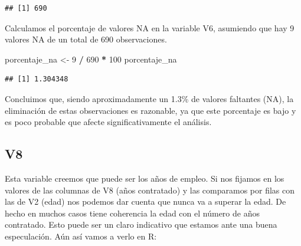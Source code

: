 \documentclass[
]{article}
\newenvironment{Shaded}{\begin{snugshade}}{\end{snugshade}}
\newcommand{\DecValTok}[1]{\textcolor[rgb]{0.00,0.00,0.81}{#1}}
\newcommand{\FunctionTok}[1]{\textcolor[rgb]{0.13,0.29,0.53}{\textbf{#1}}}
\newcommand{\NormalTok}[1]{#1}
\newcommand{\OtherTok}[1]{\textcolor[rgb]{0.56,0.35,0.01}{#1}}
\newcommand{\SpecialCharTok}[1]{\textcolor[rgb]{0.81,0.36,0.00}{\textbf{#1}}}
\begin{document}
\begin{Shaded}
\end{Shaded}

\begin{verbatim}
## [1] 690
\end{verbatim}

Calculamos el porcentaje de valores NA en la variable V6, asumiendo que
hay 9 valores NA de un total de 690 observaciones.

\begin{Shaded}
\begin{Highlighting}[]
\NormalTok{porcentaje\_na }\OtherTok{\textless{}{-}} \DecValTok{9} \SpecialCharTok{/} \DecValTok{690} \SpecialCharTok{*} \DecValTok{100}
\NormalTok{porcentaje\_na}
\end{Highlighting}
\end{Shaded}

\begin{verbatim}
## [1] 1.304348
\end{verbatim}

Concluimos que, siendo aproximadamente un 1.3\% de valores faltantes
(NA), la eliminación de estas observaciones es razonable, ya que este
porcentaje es bajo y es poco probable que afecte significativamente el
análisis.

\hypertarget{v8}{%
\subsection{V8}\label{v8}}

Esta variable creemos que puede ser los años de empleo. Si nos fijamos
en los valores de las columnas de V8 (años contratado) y las comparamos
por filas con las de V2 (edad) nos podemos dar cuenta que nunca va a
superar la edad. De hecho en muchos casos tiene coherencia la edad con
el número de años contratado. Esto puede ser un claro indicativo que
estamos ante una buena especulación. Aún así vamos a verlo en R:

\begin{Shaded}
\end{Shaded}
\end{document}
